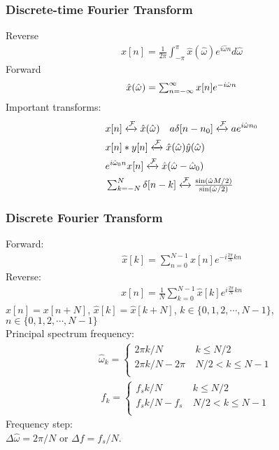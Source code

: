 \documentclass[6pt,landscape,a4paper]{article}
\begin{document}
\begin{multicols*}{5}
\subsubsection*{Discrete-time Fourier Transform}
Reverse
\vspace{-1em}
\begin{align*}
x[n]=\frac{1}{2\pi}\textstyle\int_{-\pi}^{\pi}\hat{x}(\hat{\omega})e^{i\hat{\omega}n}d\hat{\omega}
\end{align*}
Forward
\vspace{-1em}
\begin{align*}
\hat{x}(\hat{\omega})=\textstyle\textstyle\sum_{n=-\infty}^{\infty} x[n] e^{-i\hat{\omega} n}
\end{align*}
Important transforms:
\begin{align*}
&x[n]  \xleftrightarrow{\mathcal{F}} \hat{x}(\hat{\omega}) \hspace{1em} a \delta[n-n_0] \xleftrightarrow{\mathcal{F}} a e^{i\hat{\omega}n_0}  \\
&x[n]*y[n] \xleftrightarrow{\mathcal{F}} \hat{x}(\hat{\omega})\hat{y}(\hat{\omega}) \\ &e^{i\hat{\omega}_0 n}x[n] \xleftrightarrow{\mathcal{F}} \hat{x}(\hat{\omega} - \hat{\omega}_0)\\
&\textstyle\sum_{k=-N}^{N} \delta[n-k] \xleftrightarrow{\mathcal{F}} \frac{\sin(\hat{\omega}M/2)}{\sin(\hat{\omega}/2)}
\end{align*}
\subsubsection*{Discrete Fourier Transform}
Forward:
\vspace{-1em}
\begin{align*}
\hat{x}[k] = \textstyle\sum_{n=0}^{N-1}x[n]e^{-i\frac{2\pi}{N}kn}
\end{align*}
Reverse:
\vspace{-1em}
\begin{align*}
x[n] = \frac{1}{N}\textstyle\sum_{k=0}^{N-1}\hat{x}[k]e^{i\frac{2\pi}{N}kn}
\end{align*}
$x[n]=x[n+N]$, $\hat{x}[k]=\hat{x}[k+N]$, $k\in \{0,1,2,\cdots,N-1\}$, $n\in \{0,1,2,\cdots,N-1\}$\\
Principal spectrum frequency:
\begin{align*}
&  \hat{\omega}_k = \left\{\begin{array}{cl}
    2\pi k/N & ~  k \le N/2   \\
    2\pi k/N - 2\pi & ~  N/2 < k \le N-1 \\
  \end{array}
  \right.
\end{align*}
\begin{align*}
&  f_k = \left\{\begin{array}{cl}
    f_s k/N & ~  k \le N/2   \\
    f_s k/N - f_s & ~  N/2 < k \le N-1 \\
  \end{array}
  \right.
\end{align*}
\fi
Frequency step: \\
$\Delta{\hat{\omega}}=2\pi/N$ or $\Delta f = f_s/N$.


\end{multicols*}
\end{document}
